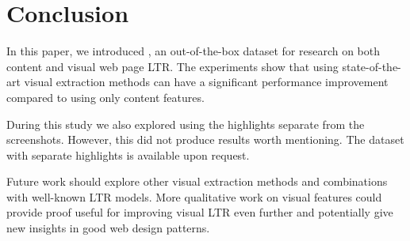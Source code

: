 
\section{Conclusion}
In this paper, we introduced \datasetname, an out-of-the-box dataset for research on both content and visual web page \ac{LTR}. The experiments show that using state-of-the-art visual extraction methods can have a significant performance improvement compared to using only content features. 

 During this study we also explored using the highlights separate from the screenshots. However, this did not produce results worth mentioning. The dataset with separate highlights is available upon request. 

Future work should explore other visual extraction methods and combinations with well-known \ac{LTR} models. More qualitative work on visual features could provide proof useful for improving visual \ac{LTR} even further and potentially give new insights in good web design patterns. 

